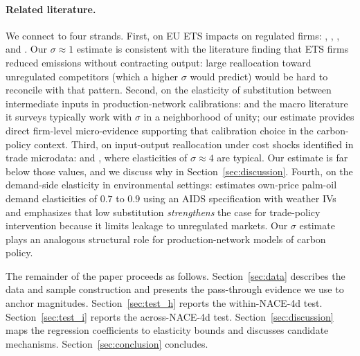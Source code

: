 \paragraph{Related literature.} We connect to four strands. First, on EU ETS impacts on regulated firms: \citet{martin2014}, \citet{dechezlepretreetal2023}, \citet{colmeretal2023}, and \citet{kanzig2023unequal}. Our $\sigma \approx 1$ estimate is consistent with the literature finding that ETS firms reduced emissions without contracting output: large reallocation toward unregulated competitors (which a higher $\sigma$ would predict) would be hard to reconcile with that pattern. Second, on the elasticity of substitution between intermediate inputs in production-network calibrations: \citet{baqaee2019} and the macro literature it surveys typically work with $\sigma$ in a neighborhood of unity; our estimate provides direct firm-level micro-evidence supporting that calibration choice in the carbon-policy context. Third, on input-output reallocation under cost shocks identified in trade microdata: \citet{huneeus2018} and \citet{peter2023}, where elasticities of $\sigma \approx 4$ are typical. Our estimate is far below those values, and we discuss why in Section~\ref{sec:discussion}. Fourth, on the demand-side elasticity in environmental settings: \citet{Hsiao2026} estimates own-price palm-oil demand elasticities of $0.7$ to $0.9$ using an AIDS specification with weather IVs and emphasizes that low substitution \emph{strengthens} the case for trade-policy intervention because it limits leakage to unregulated markets. Our $\sigma$ estimate plays an analogous structural role for production-network models of carbon policy.

The remainder of the paper proceeds as follows. Section~\ref{sec:data} describes the data and sample construction and presents the pass-through evidence we use to anchor magnitudes. Section~\ref{sec:test_h} reports the within-NACE-4d test. Section~\ref{sec:test_i} reports the across-NACE-4d test. Section~\ref{sec:discussion} maps the regression coefficients to elasticity bounds and discusses candidate mechanisms. Section~\ref{sec:conclusion} concludes.
